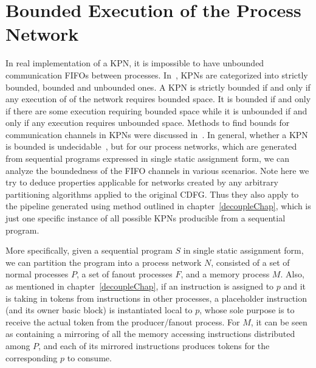 \section{Bounded Execution of the Process Network}
In real implementation of a KPN, 
it is impossible to have unbounded communication FIFOs between
processes. In~\cite{}, KPNs are 
categorized into strictly bounded, bounded and unbounded ones.
A KPN is strictly bounded if and only if any execution of of the network requires bounded space. It is bounded if and only if there are some
execution requiring bounded space while it is unbounded if and only if any
execution requires unbounded space. Methods to find bounds for communication channels
in KPNs were discussed in~\cite{}\cite{}. In general, whether a
KPN is bounded is undecidable~\cite{}, but for our process networks, which
are generated from sequential programs expressed in single static assignment
form, we can analyze the boundedness of the FIFO channels in various
scenarios. Note here we try to deduce properties applicable for
networks created by any arbitrary partitioning algorithms applied to
the original CDFG. Thus they also apply to the pipeline generated
using method outlined in chapter~\ref{decoupleChap}, which is just
one specific instance of all possible KPNs producible from a sequential program.


More specifically, given a sequential program $S$ in single static assignment form, we can partition the program into a process network $N$, consisted of a set of normal processes $P$, a set of fanout processes $F$, and a memory process $M$. 
Also, as mentioned in chapter~\ref{decoupleChap}, if an instruction is assigned to
$p$ and it is taking in tokens from instructions in other processes, a placeholder
instruction (and its owner basic block) is instantiated local to $p$, whose sole purpose is to receive
the actual token from the producer/fanout process. For $M$, it can be seen as containing a mirroring of all the memory accessing
instructions distributed among $P$, and each of its mirrored instructions 
produces tokens for the corresponding $p$ to consume.

